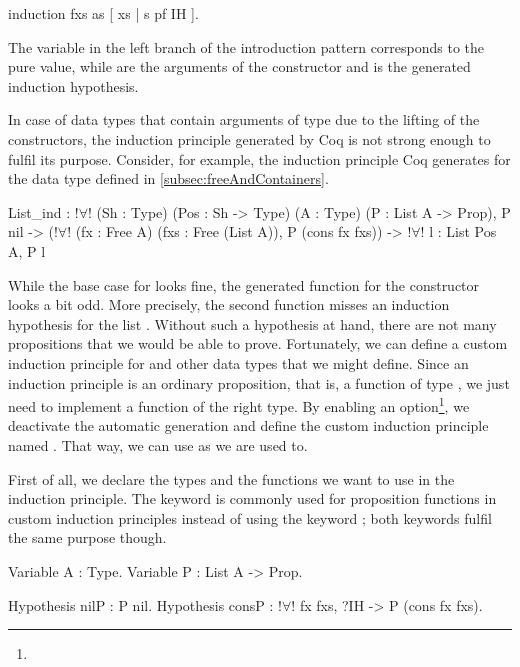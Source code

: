 \begin{coqcode}
induction fxs as [ xs | s pf IH ].
\end{coqcode}

The variable  in the left branch of the introduction pattern corresponds to the pure value, while   are the arguments of the  constructor and  is the generated induction hypothesis.

In case of data types that contain arguments of type  due to the lifting of the constructors, the induction principle generated by Coq is not strong enough to fulfil its purpose.
Consider, for example, the induction principle Coq generates for the  data type defined in \autoref{subsec:freeAndContainers}.

\begin{coqcode}
List_ind : !$\forall$! (Sh : Type) (Pos : Sh -> Type) (A : Type)
      (P : List A -> Prop),
      P nil ->
      (!$\forall$! (fx : Free A) (fxs : Free (List A)), P (cons fx fxs)) ->
      !$\forall$! l : List Pos A, P l
\end{coqcode}

While the base case for  looks fine, the generated function for the  constructor looks a bit odd.
More precisely, the second function misses an induction hypothesis for the list .
Without such a hypothesis at hand, there are not many propositions that we would be able to prove.
Fortunately, we can define a custom induction principle for  and other data types that we might define.
Since an induction principle is an ordinary proposition, that is, a function of type , we just need to implement a function of the right type.
By enabling an option\footnote{}, we deactivate the automatic generation and define the custom induction principle named .
That way, we can use  as we are used to.

First of all, we declare the types and the functions we want to use in the induction principle.
The keyword  is commonly used for proposition functions in custom induction principles instead of using the keyword ; both keywords fulfil the same purpose though.

\begin{coqcode}
Variable A : Type.
Variable P : List A -> Prop.

Hypothesis nilP : P nil.
Hypothesis consP : !$\forall$! fx fxs, ?IH -> P (cons fx fxs).
\end{coqcode}

